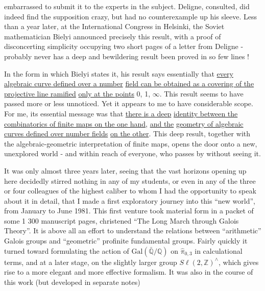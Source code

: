
embarrassed to submit it to the experts in the subject. Deligne, consulted,
did indeed find the supposition crazy, but had no counterexample
up his sleeve. Less than a year later, at the International
Congress in Helsinki, the Soviet mathematician Bielyi
announced precisely this result, with a proof of disconcerting simplicity
occupying two short pages of a letter from Deligne - probably never
has a deep and bewildering result been proved
in so few lines !

In the form in which Bielyi states it, his result says essentially
that \uline{every algebraic curve defined over a number}
\uline{field can be obtained as a covering of the projective line ramified}
\uline{only at the points} 0, 1, $\infty$. This result seems to have passed
more or less unnoticed. Yet it appears to me to have considerable
scope. For me, its essential message was that \uline{there is a deep}
\uline{identity between the combinatorics of finite maps on the one hand}, \uline{and the}
\uline{geometry of algebraic curves defined over number fields}
\uline{on the other}. This deep result, together with the algebraic-geometric
interpretation of finite maps, opens the door onto a new,
unexplored world - and within reach of everyone, who passes by without seeing it.

It was only almost three years later, seeing that the vast
horizons opening up here decidedly stirred
nothing in any of my students, or even in any of the three or
four colleagues of the highest caliber to whom I had the opportunity
to speak about it in detail, that I made a first exploratory
journey into this ``new world'', from January to June 1981. This first venture
took material form in a packet of some 1 300 manuscript pages,
christened ``The Long March through Galois Theory''.
It is above all an effort to understand the relations between
``arithmetic'' Galois groups and ``geometric'' profinite fundamental
groups. Fairly quickly it turned toward formulating
the action of $\mathrm{Gal}(\bar{\mathbb{Q}}/\mathbb{Q})$ on $\hat{\pi}_{0,3}$ in calculational terms, and at a
later stage, on the slightly larger group $S\ell(2,\mathbb{Z})^{\wedge}$, which
gives rise to a more elegant and more effective formalism. It was also
in the course of this work (but developed in separate notes)



